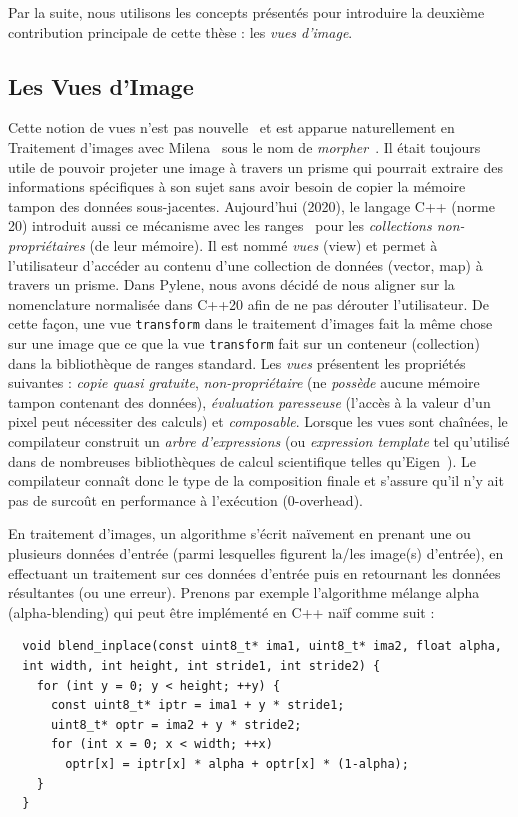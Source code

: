 Par la suite, nous utilisons les concepts présentés pour introduire la deuxième contribution principale de cette thèse :
les \emph{vues d'image}.


\subsection*{Les Vues d'Image}


Cette notion de vues n'est pas nouvelle~\parencite{novak.1997.reuse} et est apparue naturellement en Traitement d'images
avec Milena~\parencite{geraud.2012.ipolmeeting,levillain.2010.icip} sous le nom de
\emph{morpher}~\parencite{levillain.2009.ismm,geraud.2012.hdr}. Il était toujours utile de pouvoir projeter une image à
travers un prisme qui pourrait extraire des informations spécifiques à son sujet sans avoir besoin de copier la mémoire
tampon des données sous-jacentes. Aujourd'hui (2020), le langage C++ (norme 20) introduit aussi ce mécanisme avec les
ranges~\parencite{niebler.2014.ranges} pour les \emph{collections non-propriétaires} (de leur mémoire). Il est nommé
\emph{vues} (view) et permet à l'utilisateur d'accéder au contenu d'une collection de données (vector, map) à travers un
prisme. Dans Pylene, nous avons décidé de nous aligner sur la nomenclature normalisée dans C++20 afin de ne pas dérouter
l'utilisateur. De cette façon, une vue \texttt{transform} dans le traitement d'images fait la même chose sur une image
que ce que la vue \texttt{transform} fait sur un conteneur (collection) dans la bibliothèque de ranges standard. Les
\emph{vues} présentent les propriétés suivantes : \emph{copie quasi gratuite}, \emph{non-propriétaire} (ne
\emph{possède} aucune mémoire tampon contenant des données), \emph{évaluation paresseuse} (l'accès à la valeur d'un
pixel peut nécessiter des calculs) et \emph{composable}. Lorsque les vues sont chaînées, le compilateur construit un
\emph{arbre d'expressions} (ou \emph{expression template} tel qu'utilisé dans de nombreuses bibliothèques de calcul
scientifique telles qu'Eigen~\parencite{guennebaud.2010.eigen}). Le compilateur connaît donc le type de la composition
finale et s'assure qu'il n'y ait pas de surcoût en performance à l'exécution (0-overhead).

En traitement d'images, un algorithme s'écrit naïvement en prenant une ou plusieurs données d'entrée (parmi lesquelles
figurent la/les image(s) d'entrée), en effectuant un traitement sur ces données d'entrée puis en retournant les données
résultantes (ou une erreur). Prenons par exemple l'algorithme mélange alpha (alpha-blending) qui peut être implémenté en
C++ naïf comme suit :
\begin{verbatim}
  void blend_inplace(const uint8_t* ima1, uint8_t* ima2, float alpha,
  int width, int height, int stride1, int stride2) {
    for (int y = 0; y < height; ++y) {
      const uint8_t* iptr = ima1 + y * stride1;
      uint8_t* optr = ima2 + y * stride2;
      for (int x = 0; x < width; ++x)
        optr[x] = iptr[x] * alpha + optr[x] * (1-alpha);
    }
  }
\end{verbatim}

